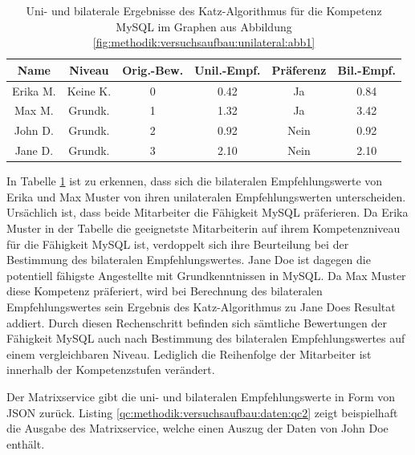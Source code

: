 \begin{table}[h]
	\centering
	\begin{tabular}{c|c|c|c|c|c}
		\textbf{Name} & \textbf{Niveau} & \textbf{Orig.-Bew.} & \textbf{Unil.-Empf.} & \textbf{Präferenz} & \textbf{Bil.-Empf.}\\
		\hline
		\rowcolor{exxetagray}Erika M. & Keine K. & 0 & 0.42 & Ja   & 0.84\\
		\hline
		\rowcolor{itemcolor}Max M.    & Grundk.  & 1 & 1.32 & Ja   & 3.42\\
		\rowcolor{itemcolor}John D.   & Grundk.  & 2 & 0.92 & Nein & 0.92\\
		\rowcolor{itemcolor}Jane D.   & Grundk.  & 3 & 2.10 & Nein & 2.10
	\end{tabular}
	\caption{Uni- und bilaterale Ergebnisse des Katz-Algorithmus für die Kompetenz MySQL im Graphen aus Abbildung \ref{fig:methodik:versuchsaufbau:unilateral:abb1}}
	\label{tbl:methodik:versuchsaufbau:unilateral:tbl3}
\end{table}

In Tabelle \ref{tbl:methodik:versuchsaufbau:unilateral:tbl3} ist zu erkennen, dass sich die bilateralen Empfehlungswerte von Erika und Max Muster von ihren unilateralen Empfehlungswerten unterscheiden. Ursächlich ist, dass beide Mitarbeiter die Fähigkeit MySQL präferieren. Da Erika Muster in der Tabelle die geeignetste Mitarbeiterin auf ihrem Kompetenzniveau für die Fähigkeit MySQL ist, verdoppelt sich ihre Beurteilung bei der Bestimmung des bilateralen Empfehlungswertes. Jane Doe ist dagegen die potentiell fähigste Angestellte mit Grundkenntnissen in MySQL. Da Max Muster diese Kompetenz präferiert, wird bei Berechnung des bilateralen Empfehlungswertes sein Ergebnis des Katz-Algorithmus zu Jane Does Resultat addiert. Durch diesen Rechenschritt befinden sich sämtliche Bewertungen der Fähigkeit MySQL auch nach Bestimmung des bilateralen Empfehlungswertes auf einem vergleichbaren Niveau. Lediglich die Reihenfolge der Mitarbeiter ist innerhalb der Kompetenzstufen verändert.

Der Matrixservice gibt die uni- und bilateralen Empfehlungswerte in Form von JSON zurück. Listing \ref{qc:methodik:versuchsaufbau:daten:qc2} zeigt beispielhaft die Ausgabe des Matrixservice, welche einen Auszug der Daten von John Doe enthält.



